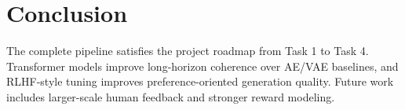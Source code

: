 \documentclass[conference]{IEEEtran}
\begin{document}
\section{Conclusion}
The complete pipeline satisfies the project roadmap from Task 1 to Task 4. Transformer models improve long-horizon coherence over AE/VAE baselines, and RLHF-style tuning improves preference-oriented generation quality. Future work includes larger-scale human feedback and stronger reward modeling.



\end{document}
